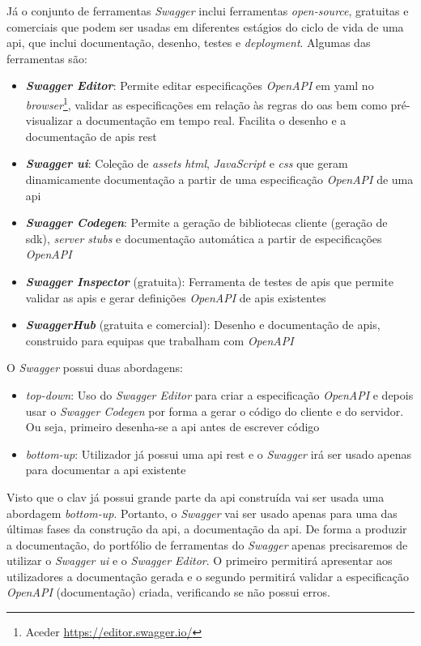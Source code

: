 Já o conjunto de ferramentas \textit{Swagger} inclui ferramentas \textit{open-source}, gratuitas e comerciais que podem ser usadas em diferentes estágios do ciclo de vida de uma \acrshort{api}, que inclui documentação, desenho, testes e \textit{deployment}. Algumas das ferramentas são:~\cite{swaggerVSoas}
\begin{itemize}
    \item \textbf{\textit{Swagger Editor}}: Permite editar especificações \textit{OpenAPI} em \acrshort{yaml} no \textit{browser}\footnote{Aceder \url{https://editor.swagger.io/}}, validar as especificações em relação às regras do \acrshort{oas} bem como pré-visualizar a documentação em tempo real. Facilita o desenho e a documentação de \acrshort{api}s \acrshort{rest}
    \item \textbf{\textit{Swagger \acrshort{ui}}}: Coleção de \textit{assets} \textit{\acrshort{html}}, \textit{JavaScript} e \textit{\acrshort{css}} que geram dinamicamente documentação a partir de uma especificação \textit{OpenAPI} de uma \acrshort{api}
    \item \textbf{\textit{Swagger Codegen}}: Permite a geração de bibliotecas cliente (geração de \acrshort{sdk}), \textit{server stubs} e documentação automática a partir de especificações \textit{OpenAPI}
    \item \textbf{\textit{Swagger Inspector}} (gratuita): Ferramenta de testes de \acrshort{api}s que permite validar as \acrshort{api}s e gerar definições \textit{OpenAPI} de \acrshort{api}s existentes
    \item \textbf{\textit{SwaggerHub}} (gratuita e comercial): Desenho e documentação de \acrshort{api}s, construido para equipas que trabalham com \textit{OpenAPI}
\end{itemize}

O \textit{Swagger} possui duas abordagens:~\cite{swaggerNode}
\begin{itemize}
    \item \textit{top-down}: Uso do \textit{Swagger Editor} para criar a especificação \textit{OpenAPI} e depois usar o \textit{Swagger Codegen} por forma a gerar o código do cliente e do servidor. Ou seja, primeiro desenha-se a \acrshort{api} antes de escrever código
    \item \textit{bottom-up}: Utilizador já possui uma \acrshort{api} \acrshort{rest} e o \textit{Swagger} irá ser usado apenas para documentar a \acrshort{api} existente
\end{itemize}

Visto que o \acrshort{clav} já possui grande parte da \acrshort{api} construída vai ser usada uma abordagem \textit{bottom-up}. Portanto, o \textit{Swagger} vai ser usado apenas para uma das últimas fases da construção da \acrshort{api}, a documentação da \acrshort{api}. De forma a produzir a documentação, do portfólio de ferramentas do \textit{Swagger} apenas precisaremos de utilizar o \textit{Swagger \acrshort{ui}} e o \textit{Swagger Editor}. O primeiro permitirá apresentar aos utilizadores a documentação gerada e o segundo permitirá validar a especificação \textit{OpenAPI} (documentação) criada, verificando se não possui erros.

